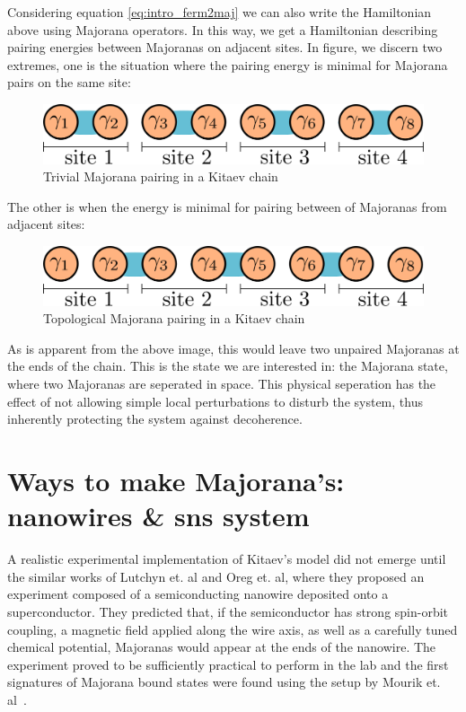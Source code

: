 	Considering equation \eqref{eq:intro_ferm2maj} we can also write the Hamiltonian above using Majorana operators.
	In this way, we get a Hamiltonian describing pairing energies between Majoranas on adjacent sites.
	In figure, we discern two extremes, one is the situation where the pairing energy is minimal for Majorana pairs on the same site:
	\begin{figure}[htb!]
	\centering
	\includegraphics[width=0.95\columnwidth]{images/majorana_trivial_pairing}
	\caption{Trivial Majorana pairing in a Kitaev chain}
	\label{fig:trivial_majoranas}
	\end{figure}

	The other is when the energy is minimal for pairing between of Majoranas from adjacent sites:
	\begin{figure}[htb!]
	\centering
	\includegraphics[width=0.95\columnwidth]{images/majorana_topological_pairing}
	\caption{Topological Majorana pairing in a Kitaev chain}
	\label{fig:topological_majoranas}
	\end{figure}
		
	As is apparent from the above image, this would leave two unpaired Majoranas at the ends of the chain.
	This is the state we are interested in: the Majorana state, where two Majoranas are seperated in space.
	This physical seperation has the effect of not allowing simple local perturbations to disturb the system, thus inherently protecting the system against decoherence.

\section{Ways to make Majorana's: nanowires \& sns system}
	A realistic experimental implementation of Kitaev's model did not emerge until the similar works of Lutchyn et. al\cite{lutchyn_majorana_2010} and Oreg et. al\cite{ oreg_helical_2010}, where they proposed an experiment composed of a semiconducting nanowire deposited onto a superconductor.
	They predicted that, if the semiconductor has strong spin-orbit coupling, a magnetic field applied along the wire axis, as well as a carefully tuned chemical potential, Majoranas would appear at the ends of the nanowire.
	The experiment proved to be sufficiently practical to perform in the lab and the first signatures of Majorana bound states were found using the setup by Mourik et. al~\cite{mourik_signatures_2012}.

